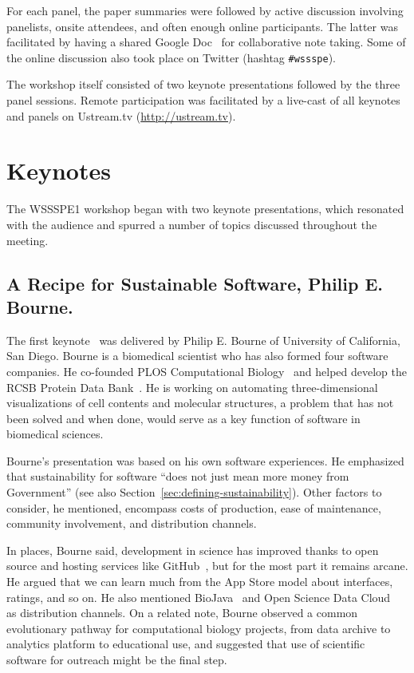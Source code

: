 \documentclass[11pt, oneside]{amsart}
\newcommand{\note}[1]{ {\textcolor{red}    { #1 }}}
\begin{document}
For each panel, the paper summaries were followed by active discussion
involving panelists, onsite attendees, and often enough online
participants. The latter was facilitated by having a shared Google
Doc~\cite{WSSSPE1-google-notes} for collaborative note taking. Some of
the online discussion also took place on Twitter (hashtag
\texttt{\#wssspe}).

The workshop itself consisted of two keynote presentations followed by
the three panel sessions.  Remote participation was facilitated by a
live-cast of all keynotes and panels on Ustream.tv
(\url{http://ustream.tv}).

\section{Keynotes } \label{sec:keynotes} %

The WSSSPE1 workshop began with two keynote presentations, which 
resonated with the audience and spurred a number of topics  
discussed throughout the meeting.

\subsection{A Recipe for Sustainable Software, Philip E. Bourne.} \label{sec:keynote1}

The first keynote~\cite{WSSSPE1-keynote1} was delivered by Philip
E. Bourne of University of California, San Diego.  Bourne is a
biomedical scientist who has also formed four software companies. He
co-founded PLOS Computational Biology~\cite{plos-web} and helped
develop the RCSB Protein Data Bank~\cite{pdb-web}.  He is working on
automating three-dimensional visualizations of cell contents and
molecular structures, a problem that has not been solved and when
done, would serve as a key function of software in biomedical
sciences.

Bourne's presentation was based on his own software experiences.  He
emphasized that sustainability for software ``does not just mean more
money from Government'' (see also
Section~\ref{sec:defining-sustainability}).  Other factors to
consider, he mentioned, encompass costs of production, ease of
maintenance, community involvement, and distribution channels.

In places, Bourne said, development in science has improved thanks to
open source and hosting services like GitHub~\cite{github-web}, but
for the most part it remains arcane. He argued that we can learn much
from the App Store model about interfaces, ratings, and so on. He also
mentioned BioJava~\cite{biojava-web} and Open Science Data
Cloud~\cite{osdc-web} as distribution channels.  On a related note,
Bourne observed a common evolutionary pathway for computational
biology projects, from data archive to analytics platform to
educational use, and suggested that use of scientific software for
outreach might be the final step.
\end{document}
